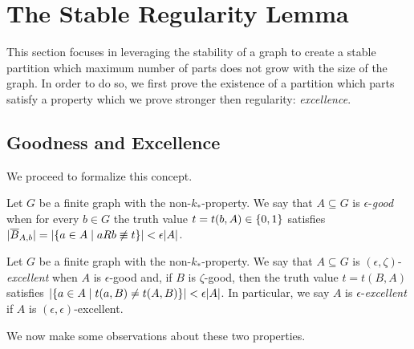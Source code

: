 \section{The Stable Regularity Lemma} \label{sec:section_5}

    This section focuses in leveraging the stability of a graph to create a stable partition which maximum number
    of parts does not grow with the size of the graph.
    In order to do so, we first prove the existence of a partition which parts satisfy a property which we prove stronger
    then regularity: \emph{excellence}.

    \subsection{Goodness and Excellence} \label{subsec:subsection_5.1}

        We proceed to formalize this concept.

        \begin{definition}[Definition 5.2(a)] \label{def:epsilon_good}
            Let $G$ be a finite graph with the non-$k_*$-property.
            We say that $A \subseteq G$ is $\epsilon$-\emph{good} when for every $b \in G$ the truth value
            $t = t(b, A) \in \{ 0, 1 \}$ satisfies
            $| \overline{B}_{A,b} | = | \{ a\in A \mid aRb \not\equiv t \} | < \epsilon |A|$.
        \end{definition}

        \begin{definition}[Definition 5.2(b)] \label{def:epsilon_excellent}
            Let $G$ be a finite graph with the non-$k_*$-property.
            We say that $A \subseteq G$ is $(\epsilon, \zeta)$-\emph{excellent} when $A$ is $\epsilon$-good and, if $B$ is
            $\zeta$-good, then the truth value $t = t(B,A)$ satisfies $| \{ a \in A \mid t(a,B) \neq t(A,B) \} | < \epsilon |A|$.
            In particular, we say $A$ is $\epsilon$-\emph{excellent} if $A$ is $(\epsilon, \epsilon)$-excellent.
        \end{definition}

        We now make some observations about these two properties.

